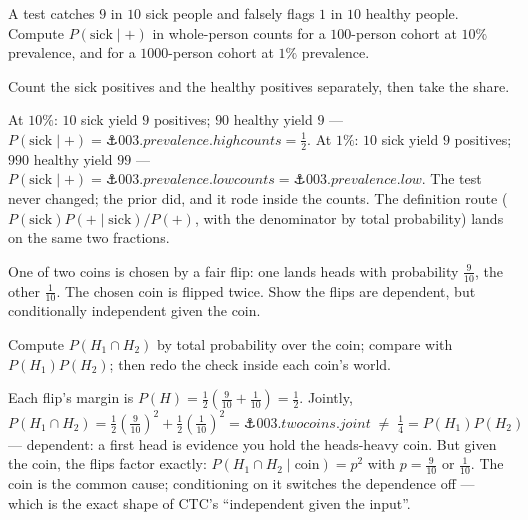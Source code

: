 \begin{problem}
A test catches $9$ in $10$ sick people and falsely flags $1$ in $10$
healthy people. Compute $P(\text{sick} \mid +)$ in whole-person counts
for a $100$-person cohort at $10\%$ prevalence, and for a
$1000$-person cohort at $1\%$ prevalence.
\begin{hint}
Count the sick positives and the healthy positives separately, then
take the share.
\end{hint}
\begin{solution}
At $10\%$: $10$ sick yield $9$ positives; $90$ healthy yield $9$ —
$P(\text{sick} \mid +) = \anchor{003.prevalence.highcounts} =
\tfrac12$. At $1\%$: $10$ sick yield $9$ positives; $990$ healthy
yield $99$ — $P(\text{sick} \mid +) =
\anchor{003.prevalence.lowcounts} = \anchor{003.prevalence.low}$. The
test never changed; the prior did, and it rode inside the counts. The
definition route ($P(\text{sick})P(+ \mid \text{sick})/P(+)$, with the
denominator by total probability) lands on the same two fractions.
\end{solution}
\end{problem}

\begin{problem}[stretch]
One of two coins is chosen by a fair flip: one lands heads with
probability $\tfrac{9}{10}$, the other $\tfrac{1}{10}$. The chosen
coin is flipped twice. Show the flips are dependent, but conditionally
independent given the coin.
\begin{hint}
Compute $P(H_1 \cap H_2)$ by total probability over the coin; compare
with $P(H_1)P(H_2)$; then redo the check inside each coin's world.
\end{hint}
\begin{solution}
Each flip's margin is $P(H) = \tfrac12(\tfrac{9}{10} + \tfrac{1}{10})
= \tfrac12$. Jointly,
\[
  P(H_1 \cap H_2)
  = \tfrac12\left(\tfrac{9}{10}\right)^2
  + \tfrac12\left(\tfrac{1}{10}\right)^2
  = \anchor{003.twocoins.joint}
  \;\neq\; \tfrac14 = P(H_1)P(H_2)
\]
— dependent: a first head is evidence you hold the heads-heavy coin.
But given the coin, the flips factor exactly:
$P(H_1 \cap H_2 \mid \text{coin}) = p^2$ with $p = \tfrac{9}{10}$ or
$\tfrac{1}{10}$. The coin is the common cause; conditioning on it
switches the dependence off — which is the exact shape of CTC's
``independent given the input''.
\end{solution}
\end{problem}
